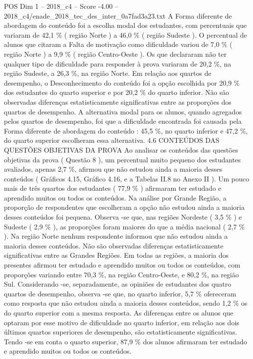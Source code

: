 \begin{textsample}{POS Dim 1 – 2018\_c4 – Score -4.00 – 2018\_c4/enade\_2018\_tec\_des\_inter\_0a7fad3a23.txt}
A Forma diferente de abordagem do conteúdo foi a escolha modal dos estudantes, com percentuais que variaram de 42,1 \% ( região Norte ) a 46,0 \% ( região Sudeste ).
O percentual de alunos que citaram a Falta de motivação como dificuldade variou de 7,0 \% ( região Norte ) a 9,9 \% ( região Centro-Oeste ).
Os que declararam não ter qualquer tipo de dificuldade para responder à prova variaram de 20,2 \%, na região Sudeste, a 26,3 \%, na região Norte.
Em relação aos quartos de desempenho, o Desconhecimento do conteúdo foi a opção escolhida por 20,9 \% dos estudantes do quarto superior e por 20,2 \% do quarto inferior.
Não são observadas diferenças estatisticamente significativas entre as proporções dos quartos de desempenho.
A alternativa modal para os alunos, quando agregados pelos quartos de desempenho, foi que a dificuldade encontrada foi causada pela Forma diferente de abordagem do conteúdo : 45,5 \%, no quarto inferior e 47,2 \%, do quarto superior escolheram essa alternativa. 4.6 CONTEÚDOS DAS QUESTÕES OBJETIVAS DA PROVA Ao analisar os conteúdos das questões objetivas da prova ( Questão 8 ), um percentual muito pequeno dos estudantes avaliados, apenas 2,7 \%, afirmou que não estudou ainda a maioria desses conteúdos ( Gráficos 4.15, Gráfico 4.16, e a Tabelas II.8 no Anexo II ).
Um pouco mais de três quartos dos estudantes ( 77,9 \% ) afirmaram ter estudado e aprendido muitos ou todos os conteúdos.
Na análise por Grande Região, a proporção de respondentes que escolheram a opção não estudou ainda a maioria desses conteúdos foi pequena.
Observa -se que, nas regiões Nordeste ( 3,5 \% ) e Sudeste ( 2,9 \% ), as proporções foram maiores do que a média nacional ( 2,7 \% ).
Na região Norte nenhum respondente informou que não estudou ainda a maioria desses conteúdos.
Não são observadas diferenças estatisticamente significativas entre as Grandes Regiões.
Em todas as regiões, a maioria dos presentes afirmou ter estudado e aprendido muitos ou todos os conteúdos, com proporções variando entre 70,3 \%, na região Centro-Oeste, e 80,2 \%, na região Sul.
Considerando -se, separadamente, as opiniões de estudantes dos quatro quartos de desempenho, observa -se que, no quarto inferior, 5,7 \% ofereceram como resposta que não estudou ainda a maioria desses conteúdos, sendo 1,2 \% os do quarto superior com a mesma resposta.
As diferenças entre os alunos que optaram por esse motivo de dificuldade no quarto inferior, em relação aos dois últimos quartos superiores de desempenho, são estatisticamente significativas.
Tendo -se em conta o quarto superior, 87,9 \% dos alunos afirmaram ter estudado e aprendido muitos ou todos os conteúdos.

\end{textsample}
